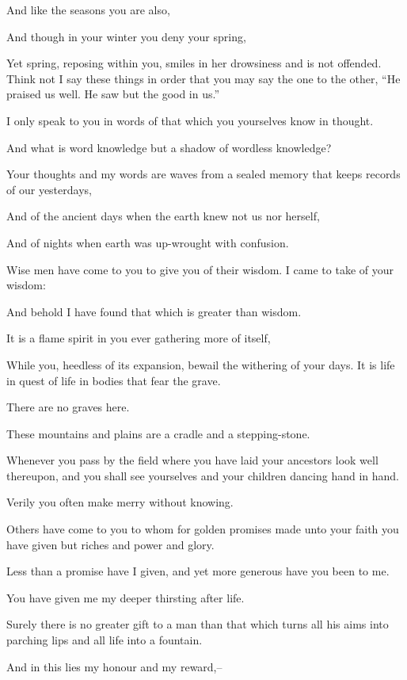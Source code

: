 And like the seasons you are also,

And though in your winter you deny your
spring,

Yet spring, reposing within you, smiles
in her drowsiness and is not offended.
Think not I say these things in
order that you may say the one to the
other, \enquote{He praised us well. He saw but
the good in us.}

I only speak to you in words of that
which you yourselves know in thought.

And what is word knowledge but a shadow
of wordless knowledge?

Your thoughts and my words are waves
from a sealed memory that keeps records
of our yesterdays,

And of the ancient days when the earth
knew not us nor herself,

And of nights when earth was up-wrought
with confusion.



Wise men have come to you to give you
of their wisdom. I came to take of your
wisdom:

And behold I have found that which is
greater than wisdom.

It is a flame spirit in you ever
gathering more of itself,

While you, heedless of its expansion,
bewail the withering of your days.
It is life in quest of life in
bodies that fear the grave.



There are no graves here.

These mountains and plains are a cradle
and a stepping-stone.

Whenever you pass by the field where
you have laid your ancestors look well
thereupon, and you shall see yourselves
and your children dancing hand in hand.

Verily you often make merry without
knowing.

Others have come to you to whom for
golden promises made unto your faith
you have given but riches and power and
glory.

Less than a promise have I given, and
yet more generous have you been to me.

You have given me my deeper thirsting
after life.

Surely there is no greater gift to a man
than that which turns all his aims
into parching lips and all life into a
fountain.


And in this lies my honour and my
reward,--

